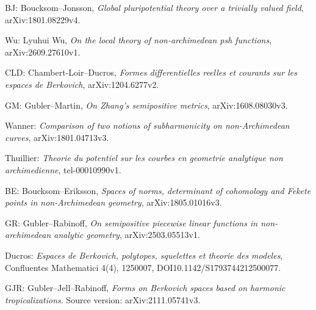 \documentclass[
  10pt,
]{article}
\begin{document}
BJ: Boucksom--Jonsson, \emph{Global pluripotential theory over a
trivially valued field}, arXiv:1801.08229v4.

Wu: Lyuhui Wu, \emph{On the local theory of non-archimedean psh
functions}, arXiv:2609.27610v1.

CLD: Chambert-Loir--Ducros, \emph{Formes differentielles reelles et
courants sur les espaces de Berkovich}, arXiv:1204.6277v2.

GM: Gubler--Martin, \emph{On Zhang's semipositive metrics},
arXiv:1608.08030v3.

Wanner: \emph{Comparison of two notions of subharmonicity on
non-Archimedean curves}, arXiv:1801.04713v3.

Thuillier: \emph{Theorie du potentiel sur les courbes en geometrie
analytique non archimedienne}, tel-00010990v1.

BE: Boucksom--Eriksson, \emph{Spaces of norms, determinant of cohomology
and Fekete points in non-Archimedean geometry}, arXiv:1805.01016v3.

GR: Gubler--Rabinoff, \emph{On semipositive piecewise linear functions
in non-archimedean analytic geometry}, arXiv:2503.05513v1.

Ducros: \emph{Espaces de Berkovich, polytopes, squelettes et theorie des
modeles}, Confluentes Mathematici 4(4), 1250007,
DOI10.1142/S1793744212500077.

GJR: Gubler--Jell--Rabinoff, \emph{Forms on Berkovich spaces based on
harmonic tropicalizations}. Source version: arXiv:2111.05741v3.
\end{document}
